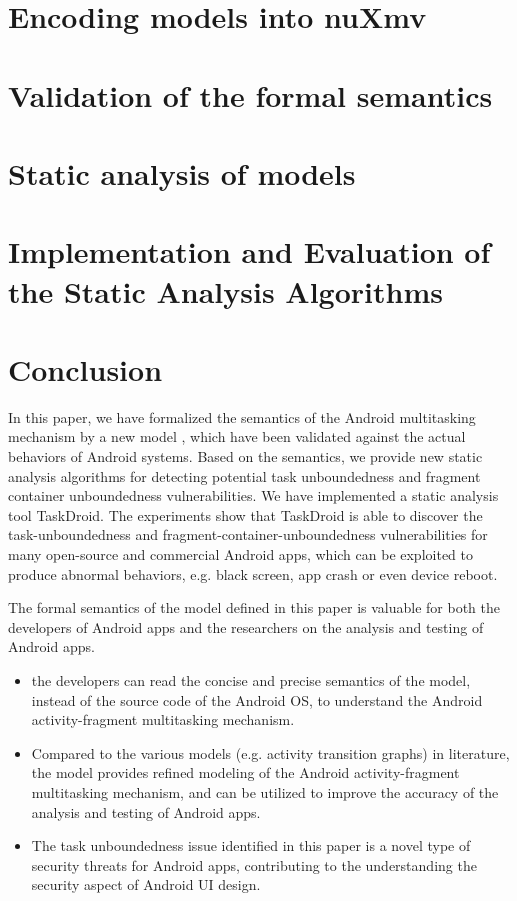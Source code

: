 \documentclass[acmsmall,manuscript,screen,review]{acmart}
\begin{document}
\section{Encoding {\AMASS} models into nuXmv}\label{sec:amass2fsm}


\section{Validation of the formal semantics} \label{sec:validation}


\section{Static analysis of {\AMASS} models} \label{sec:static}


\section{Implementation and Evaluation of the Static Analysis Algorithms}  \label{sec:eva}



\section{Conclusion} \label{sec:conc}
In this paper, we have formalized the semantics of the Android multitasking mechanism by a new model {\AMASS}, which have been validated against the actual behaviors of Android systems. Based on the semantics, we provide new static analysis algorithms for detecting potential task unboundedness and fragment container unboundedness vulnerabilities. We have implemented a static analysis tool TaskDroid. The experiments show that TaskDroid is able to discover the task-unboundedness and fragment-container-unboundedness vulnerabilities for many open-source and commercial Android apps, which can be exploited to produce abnormal behaviors, e.g. black screen, app crash or even device reboot. 

The formal semantics of the {\AMASS} model defined in this paper is valuable for both the developers of Android apps and the researchers on the analysis and testing of Android apps. 
\begin{itemize}
\item the developers can read the concise and precise semantics of the {\AMASS} model, instead of the source code of the Android OS, to understand the Android activity-fragment multitasking mechanism. %
%
\item Compared to the various models (e.g. activity transition graphs) in literature,  the {\AMASS} model provides refined modeling of the Android activity-fragment multitasking mechanism, and can be utilized to improve the accuracy of the analysis and testing of Android apps. 
%
\item The task unboundedness issue identified in this paper is a novel type of security threats for Android apps, contributing to %
the understanding the security aspect of Android UI design. 
\end{itemize}
\end{document}
